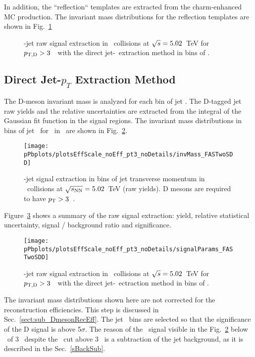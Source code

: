 In addition, the ``reflection`` templates are extracted from the charm-enhanced MC production. The invariant mass distributions for the reflection templates are shown in Fig.~\ref{fig:reflectionDZero_Dbin} %

\begin{figure}[bth]
\centering
\caption{\Dstar-jet raw signal extraction in \pPb\ collisions at $\sqrt{s}=5.02$~TeV for $p_{\mathrm{T,D}}>3$~\GeVc\ with the direct jet-\pt\ extraction method in bins of \ptchjet.}
\label{fig:reflectionDZero_Dbin}
\end{figure}


\subsection{Direct Jet-$p_T$ Extraction Method}
\label{sect:DirectJet}

The D-meson invariant mass is analyzed for each bin of jet \pt. The D-tagged jet raw yields and the relative uncertainties are extracted from the integral of the Gaussian fit function in the signal regions.
The invariant mass distributions in bins of jet \pt\ for \Dstar\ in \pPb\ are shown in Fig.~\ref{fig:eq_pPb_InvMass_Dstar}.

\begin{figure}[bth]
\centering
\texttt{[image: pPbplots/plotsEffScale\_noEff\_pt3\_noDetails/invMass\_FASTwoSDD]}
\caption{\Dstar-jet signal extraction in bins of jet transverse momentum in \pPb\ collisions at $\sqrt{s_{\rm NN}}=5.02$~TeV (raw yields). D mesons are required to have $p_{\rm T}>3$~\GeVc.}
\label{fig:eq_pPb_InvMass_Dstar}
\end{figure}

Figure~\ref{fig:eq_pPb_RSU_raw} shows a summary of the raw signal extraction: yield, relative statistical uncertainty, signal / background ratio and significance.

\begin{figure}[bth]
\centering
\texttt{[image: pPbplots/plotsEffScale\_noEff\_pt3\_noDetails/signalParams\_FASTwoSDD]}
\caption{\Dstar-jet raw signal extraction in \pPb\ collisions at $\sqrt{s}=5.02$~TeV for $p_{\mathrm{T,D}}>3$~\GeVc\ with the direct jet-\pt\ ectraction method in bins of \ptchjet.}
\label{fig:eq_pPb_RSU_raw}
\end{figure}

The invariant mass distributions shown here are not corrected for the reconstruction efficiencies. This step is discussed in Sec.~\ref{sect:sub_DmesonRecEff}.
The jet \pt\ bins are selected so that the significance of the D signal is above 5$\sigma$.
The reason of the \Dstar\ signal visible in the Fig.~\ref{fig:eq_pPb_InvMass_Dstar} below \ptjet\ of 3 \GeVc\ despite the \ptd\ cut above 3 \GeVc\ is a subtraction of the jet background, as it is described in the Sec.~\ref{sBackSub}.


